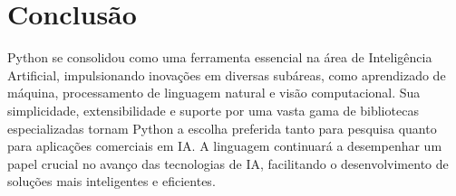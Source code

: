 \chapter{Conclusão}
Python se consolidou como uma ferramenta essencial na área de Inteligência Artificial, impulsionando inovações em diversas subáreas, como aprendizado de máquina, processamento de linguagem natural e visão computacional. Sua simplicidade, extensibilidade e suporte por uma vasta gama de bibliotecas especializadas tornam Python a escolha preferida tanto para pesquisa quanto para aplicações comerciais em IA. A linguagem continuará a desempenhar um papel crucial no avanço das tecnologias de IA, facilitando o desenvolvimento de soluções mais inteligentes e eficientes.